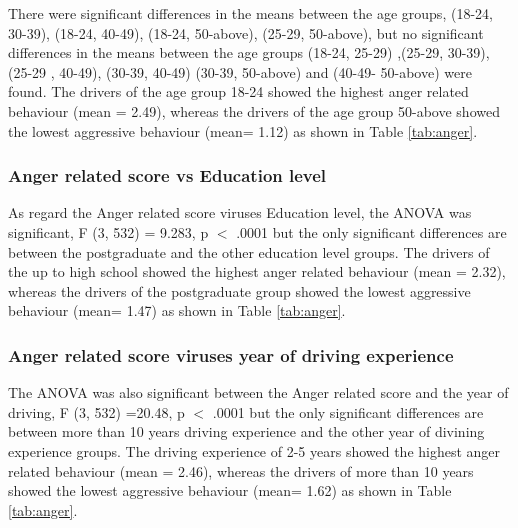 \documentclass[preprint,12pt,a4paper,authoryear]{elsarticle}
\begin{document}
\begin{linenumbers}
There were significant differences in the means between the age groups, (18-24, 30-39), (18-24, 40-49), (18-24, 50-above), (25-29, 50-above), but no significant differences in the means between the age groups (18-24, 25-29) ,(25-29, 30-39), (25-29 , 40-49), (30-39, 40-49)  (30-39, 50-above)  and (40-49- 50-above)  were found. The drivers of the age group 18-24 showed the highest anger related behaviour (mean = 2.49), whereas the drivers of the age group 50-above showed the lowest aggressive behaviour (mean= 1.12) as shown in Table \ref{tab:anger}.

\subsubsection{Anger related score vs Education level}

As regard the Anger related score viruses Education level, the ANOVA was significant, F (3, 532) = 9.283, p $<$ .0001 but the only significant differences are between the postgraduate and the other education level groups. The drivers of the up to high school showed the highest anger related behaviour (mean = 2.32), whereas the drivers of the postgraduate group showed the lowest aggressive behaviour (mean= 1.47) as shown in Table \ref{tab:anger}.

\subsubsection{Anger related score viruses year of driving experience}
The ANOVA was also significant between the Anger related score and the year of driving, F (3, 532) =20.48, p $<$ .0001 but the only significant differences are between more than 10 years driving experience and  the other year of divining experience groups. The driving experience of 2-5 years showed the highest anger related behaviour (mean = 2.46), whereas the drivers of more than 10 years showed the lowest aggressive behaviour (mean= 1.62) as shown in Table \ref{tab:anger}.


\end{linenumbers}
\end{document}
